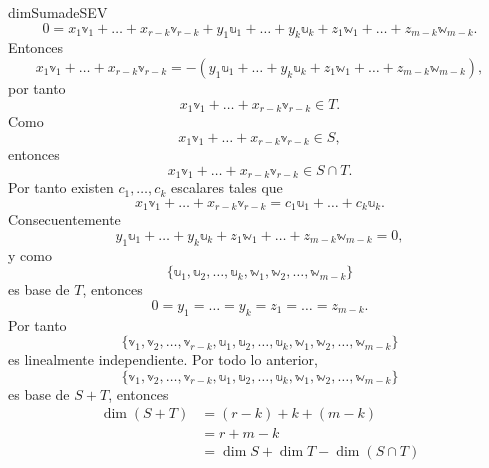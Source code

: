 \begin{theorem}{}{dimSumadeSEV}
    $$0 = x_1 \mathbb{v}_1 + \dots + x_{r-k} \mathbb{v}_{r-k} + y_1 \mathbb{u}_1 + \dots + y_k \mathbb{u}_k + z_1 \mathbb{w}_1 + \dots + z_{m-k} \mathbb{w}_{m-k}.$$
    Entonces
    $$x_1 \mathbb{v}_1 + \dots + x_{r-k} \mathbb{v}_{r-k} = -(y_1 \mathbb{u}_1 + \dots + y_k \mathbb{u}_k + z_1 \mathbb{w}_1 + \dots + z_{m-k} \mathbb{w}_{m-k}),$$
    por tanto
    $$x_1 \mathbb{v}_1 + \dots + x_{r-k} \mathbb{v}_{r-k} \in T.$$
    Como
    $$x_1 \mathbb{v}_1 + \dots + x_{r-k} \mathbb{v}_{r-k} \in S,$$
    entonces
    $$x_1 \mathbb{v}_1 + \dots + x_{r-k} \mathbb{v}_{r-k} \in S \cap T.$$
    Por tanto existen $c_1, \dots, c_k$ escalares tales que
    $$x_1 \mathbb{v}_1 + \dots + x_{r-k} \mathbb{v}_{r-k} = c_1 \mathbb{u}_1 + \dots + c_k \mathbb{u}_k.$$
    Consecuentemente
    $$y_1 \mathbb{u}_1 + \dots + y_k \mathbb{u}_k + z_1 \mathbb{w}_1 + \dots + z_{m-k} \mathbb{w}_{m-k} = 0,$$
    \newpage
    y como
    $$\{\mathbb{u}_1, \mathbb{u}_2, \dots, \mathbb{u}_k, \mathbb{w}_1, \mathbb{w}_2, \dots, \mathbb{w}_{m-k}\}$$
    es base de $T$, entonces
    $$0 = y_1 = \dots = y_k = z_1 = \dots = z_{m-k}.$$
    Por tanto
    $$\{\mathbb{v}_1, \mathbb{v}_2, \dots, \mathbb{v}_{r-k}, \mathbb{u}_1, \mathbb{u}_2, \dots, \mathbb{u}_k, \mathbb{w}_1, \mathbb{w}_2, \dots, \mathbb{w}_{m-k}\}$$
    es linealmente independiente. Por todo lo anterior,
    $$\{\mathbb{v}_1, \mathbb{v}_2, \dots, \mathbb{v}_{r-k}, \mathbb{u}_1, \mathbb{u}_2, \dots, \mathbb{u}_k, \mathbb{w}_1, \mathbb{w}_2, \dots, \mathbb{w}_{m-k}\}$$
    es base de $S + T$, entonces
    \begin{align*}
        \dim(S + T) & = (r - k) + k + (m - k) \\
        & = r + m - k \\
        & = \dim S + \dim T - \dim(S \cap T)
    \end{align*}
\end{theorem}

